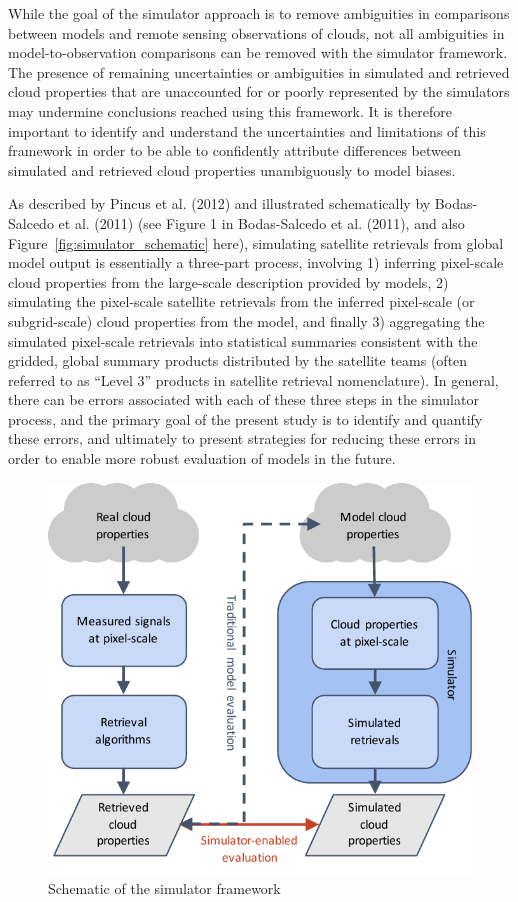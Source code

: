 While the goal of the simulator approach is to remove ambiguities in
comparisons between models and remote sensing observations of clouds,
not all ambiguities in model-to-observation comparisons can be removed
with the simulator framework. The presence of remaining uncertainties or
ambiguities in simulated and retrieved cloud properties that are
unaccounted for or poorly represented by the simulators may undermine
conclusions reached using this framework. It is therefore important to
identify and understand the uncertainties and limitations of this
framework in order to be able to confidently attribute differences
between simulated and retrieved cloud properties unambiguously to model
biases.

As described by Pincus et al. (2012) and illustrated schematically by
Bodas-Salcedo et al. (2011) (see Figure 1 in Bodas-Salcedo et al.
(2011), and also Figure~\ref{fig:simulator_schematic} here), simulating
satellite retrievals from global model output is essentially a
three-part process, involving 1) inferring pixel-scale cloud properties
from the large-scale description provided by models, 2) simulating the
pixel-scale satellite retrievals from the inferred pixel-scale (or
subgrid-scale) cloud properties from the model, and finally 3)
aggregating the simulated pixel-scale retrievals into statistical
summaries consistent with the gridded, global summary products
distributed by the satellite teams (often referred to as ``Level 3''
products in satellite retrieval nomenclature). In general, there can be
errors associated with each of these three steps in the simulator
process, and the primary goal of the present study is to identify and
quantify these errors, and ultimately to present strategies for reducing
these errors in order to enable more robust evaluation of models in the
future.

\begin{figure}[htbp]
\centering
\includegraphics{graphics/simulator_schematic.pdf}
\caption{\label{fig:simulator_schematic}Schematic of the simulator
framework}\label{fig:simulatorux5fschematic}
\end{figure}


